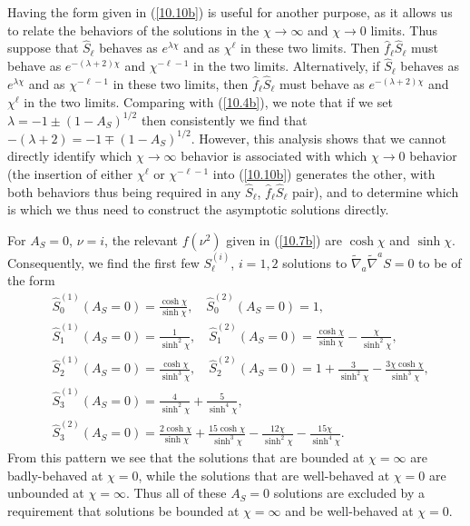 Having the form given in (\ref{10.10b}) is  useful for another purpose, as it allows us to relate the behaviors of the solutions in the $\chi\rightarrow \infty$ and $\chi\rightarrow 0$ limits. Thus suppose that $\hat{S}_{\ell}$ behaves as $e^{\lambda\chi}$ and as $\chi^{\ell}$ in these two limits. Then $\hat{f}_{\ell}\hat{S}_{\ell}$ must behave as $e^{-(\lambda+2)\chi}$ and $\chi^{-\ell-1}$ in the two limits. Alternatively, if $\hat{S}_{\ell}$ behaves as $e^{\lambda\chi}$ and as $\chi^{-\ell-1}$ in these two limits, then $\hat{f}_{\ell}\hat{S}_{\ell}$ must behave as $e^{-(\lambda+2)\chi}$ and $\chi^{\ell}$ in the two limits. Comparing with (\ref{10.4b}), we note that if we set $\lambda=-1\pm(1-A_S)^{1/2}$ then consistently we find that $-(\lambda+2)=-1\mp(1-A_S)^{1/2}$. However, this analysis shows that we cannot directly identify which  $\chi\rightarrow \infty$ behavior is associated with which $\chi\rightarrow 0$ behavior (the insertion of either $\chi^{\ell}$ or $\chi^{-\ell -1}$ into (\ref{10.10b}) generates the other, with both behaviors thus being required in any $\hat{S}_{\ell}$, $\hat{f}_{\ell}\hat{S}_{\ell}$ pair), and to determine which is which we thus need to construct the asymptotic solutions directly.

For $A_S=0$, $\nu=i$,  the relevant $f(\nu^2)$ given in (\ref{10.7b}) are $\cosh \chi$ and $\sinh \chi$. 
Consequently, we find the first few $S^{(i)}_{\ell}$, $i=1,2$ solutions to $\tilde{\nabla}_a\tilde{\nabla}^aS=0$ to be of the form 
%
\begin{align}
&\hat{S}^{(1)}_{0}(A_S=0)=\frac{\cosh\chi}{\sinh\chi},\quad \hat{S}^{(2)}_{0}(A_S=0)=1,
\nonumber\\
&\hat{S}^{(1)}_{1}(A_S=0)=\frac{1}{\sinh^2\chi},\quad \hat{S}^{(2)}_{1}(A_S=0)=\frac{\cosh\chi}{\sinh\chi}-\frac{\chi}{\sinh^2\chi},
\nonumber\\
&\hat{S}^{(1)}_{2}(A_S=0)=\frac{\cosh\chi}{\sinh^3\chi},\quad \hat{S}^{(2)}_{2}(A_S=0)=1+\frac{3}{\sinh^2\chi}-\frac{3\chi\cosh\chi}{\sinh^3\chi},
\nonumber\\
&\hat{S}^{(1)}_{3}(A_S=0)=\frac{4}{\sinh^2\chi}+\frac{5}{\sinh^4\chi},
\nonumber\\
& \hat{S}^{(2)}_{3}(A_S=0)=
\frac{2\cosh\chi}{\sinh\chi}+\frac{15\cosh\chi}{\sinh^3\chi}-\frac{12\chi}{\sinh^2\chi}-\frac{15\chi}{\sinh^4\chi}.
\label{10.11b}
\end{align}
%
From this pattern we see that the solutions that are bounded at $\chi=\infty$ are badly-behaved at $\chi=0$, while the solutions that are  well-behaved at $\chi=0$ are unbounded at $\chi=\infty$. Thus all of these $A_S=0$ solutions are excluded by a requirement that solutions be  bounded at $\chi=\infty$ and be well-behaved at $\chi=0$.

